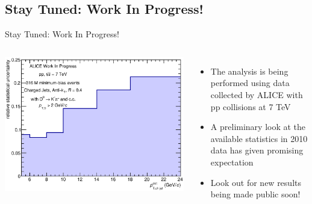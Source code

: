 \documentclass{beamer}
\begin{document}
\subsection*{Stay Tuned: Work In Progress!}
\begin{frame}{Stay Tuned: Work In Progress!}
\begin{columns}
\includegraphics[width=\textwidth]{img/HQ16_WorkInProgress_StatisticalUncertainty}
\begin{itemize}
\item The analysis is being performed using data collected by ALICE with pp collisions at 7 TeV
\item A preliminary look at the available statistics in 2010 data has given promising expectation
\item Look out for new results being made public soon!
\end{itemize}
\end{columns}
\end{frame}


\end{document}
